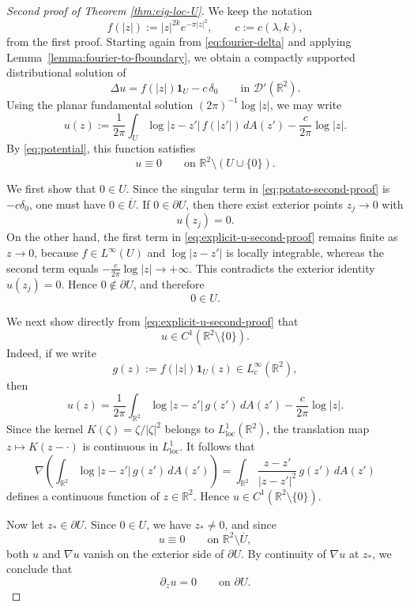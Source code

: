 \documentclass[a4paper,11pt,reqno]{amsart}
\numberwithin{equation}{section}
\theoremstyle{plain} %
\theoremstyle{definition} %
\theoremstyle{remark}
\newcommand{\R}{\mathbb{R}}
\begin{document}
\begin{proof}[Second proof of Theorem \ref{thm:eig-loc-U}]
We keep the notation
\[
f(|z|):=|z|^{2k}e^{-\pi|z|^2},
\qquad
c:=c(\lambda,k),
\]
from the first proof.  Starting again from \eqref{eq:fourier-delta} and applying
Lemma~\ref{lemma:fourier-to-fboundary}, we obtain a compactly supported distributional solution
of
\begin{equation}\label{eq:potato-second-proof}
\Delta u=f(|z|)\mathbf{1}_U-c\,\delta_0
\qquad\text{in }\mathcal D'(\R^2).
\end{equation}
Using the planar fundamental solution \((2\pi)^{-1}\log|z|\), we may write
\begin{equation}\label{eq:explicit-u-second-proof}
u(z):=\frac{1}{2\pi}\int_U \log|z-z'|\,f(|z'|)\,dA(z')-\frac{c}{2\pi}\log|z|.
\end{equation}
By \eqref{eq:potential}, this function satisfies
\[
u\equiv 0
\qquad\text{on }\R^2\setminus (U\cup\{0\}).
\]

We first show that \(0\in U\). Since the singular term in
\eqref{eq:potato-second-proof} is \(-c\delta_0\), one must have \(0\in\overline U\). If
\(0\in\partial U\), then there exist exterior points \(z_j\to 0\) with
\[
u(z_j)=0.
\]
On the other hand, the first term in \eqref{eq:explicit-u-second-proof} remains finite as
\(z\to 0\), because \(f\in L^\infty(U)\) and \(\log|z-z'|\) is locally integrable, whereas the
second term equals \(-\frac{c}{2\pi}\log|z|\to +\infty\). This contradicts the exterior identity
\(u(z_j)=0\). Hence \(0\notin\partial U\), and therefore
\[
0\in U.
\]

We next show directly from \eqref{eq:explicit-u-second-proof} that
\[
u\in C^1(\R^2\setminus\{0\}).
\]
Indeed, if we write
\[
g(z):=f(|z|)\mathbf{1}_U(z)\in L^\infty_c(\R^2),
\]
then
\[
u(z)=\frac{1}{2\pi}\int_{\R^2}\log|z-z'|\,g(z')\,dA(z')-\frac{c}{2\pi}\log|z|.
\]
Since the kernel \(K(\zeta)=\zeta/|\zeta|^2\) belongs to \(L^1_{\mathrm{loc}}(\R^2)\), the
translation map \(z\mapsto K(z-\cdot)\) is continuous in \(L^1_{\mathrm{loc}}\). It follows that
\[
\nabla\!\left(\int_{\R^2}\log|z-z'|\,g(z')\,dA(z')\right)
=
\int_{\R^2}\frac{z-z'}{|z-z'|^2}\,g(z')\,dA(z')
\]
defines a continuous function of \(z\in\R^2\). Hence \(u\in C^1(\R^2\setminus\{0\})\).

Now let \(z_*\in\partial U\). Since \(0\in U\), we have \(z_*\neq 0\), and since
\[
u\equiv 0
\qquad\text{on }\R^2\setminus \overline U,
\]
both \(u\) and \(\nabla u\) vanish on the exterior side of \(\partial U\). By continuity of
\(\nabla u\) at \(z_*\), we conclude that
\begin{equation}\label{eq:dz-zero-second-proof}
\partial_z u=0
\qquad\text{on }\partial U.
\end{equation}


\end{proof}
\end{document}
